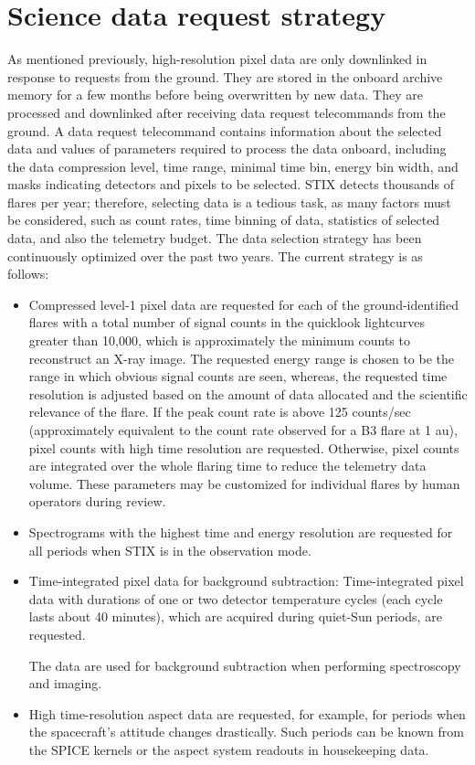 \documentclass[referee]{aa} %
\begin{document}
\section{Science data request strategy}
\label{sec:datareq}
As mentioned previously, high-resolution pixel data are only downlinked in response to requests from the
ground. They are stored in the onboard archive memory for a few months before being overwritten by new data. They are processed and downlinked 
after receiving data request telecommands from the ground. 
A data request telecommand contains information about the selected data and values of parameters  required to process the data onboard, including the data compression level, 
time range, minimal time bin, energy bin width, 
and  masks indicating detectors and pixels to be selected. 
STIX detects thousands of flares per year; therefore, 
selecting data is a tedious task, as many factors must be considered,  such as count rates, time binning of data, statistics of selected data, and also the telemetry budget. 
The data selection strategy has been continuously optimized over the past two years. The current strategy is as follows: 
\begin{itemize}
  \item  
 Compressed level-1 pixel data are requested for each of the ground-identified  flares with a total number of signal counts in the quicklook lightcurves greater than 10,000, which is approximately the minimum counts to reconstruct an X-ray image. 
The requested energy range is chosen to be the range in which obvious signal counts are seen,  
whereas, the requested time resolution is adjusted based on the amount of data allocated and the scientific relevance of the flare. 
If the peak count rate is above 125 counts/sec (approximately equivalent to the count rate observed for a B3 flare at 1 au), pixel counts with high time resolution are requested.  Otherwise, pixel counts are integrated over the whole flaring time to reduce the telemetry data volume.   These parameters may be customized for individual flares by human operators during review.
 \item  Spectrograms with the highest time and energy resolution are requested for all periods when STIX is in the observation mode. 
 \item Time-integrated pixel data for background subtraction:
Time-integrated pixel data with durations of one or two detector temperature cycles (each cycle lasts about 40 minutes), which are acquired during quiet-Sun periods, are requested. 

The data are used for background subtraction when performing spectroscopy and imaging. 
\item High time-resolution aspect data are requested, for example, for periods when the spacecraft's attitude changes drastically.
Such periods can be known from the SPICE kernels or the aspect system readouts in housekeeping data. 
\end{itemize}
\end{document}

